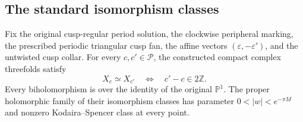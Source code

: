 \subsection{The standard isomorphism classes}\hypertarget{tag-01PE}{}\label{fam:section:A.5}

\begin{theorem}\hypertarget{tag-01Q6}{}\label{fam:src:A.5.1}\label{fam:st:A.5.1}\label{wb:pshift:thm:classification}

Fix the original cusp-regular period solution, the clockwise peripheral marking, the prescribed periodic triangular cusp fan, the affine vectors $(\varepsilon,-\varepsilon')$, and the untwisted cusp collar. For every $c,c'\in\mathcal P$, the constructed compact complex threefolds satisfy
\[
 X_c\simeq X_{c'}\quad\Longleftrightarrow\quad c'-c\in2\mathbb Z.
\]
Every biholomorphism is over the identity of the original $\mathbb P^1$. The proper holomorphic family of their isomorphism classes has parameter $0<|w|<e^{-\pi M}$ and nonzero Kodaira--Spencer class at every point.
\end{theorem}



